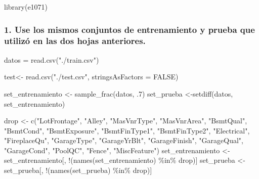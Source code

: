 \documentclass[
]{article}
\newenvironment{Shaded}{\begin{snugshade}}{\end{snugshade}}
\newcommand{\AttributeTok}[1]{\textcolor[rgb]{0.77,0.63,0.00}{#1}}
\newcommand{\ConstantTok}[1]{\textcolor[rgb]{0.00,0.00,0.00}{#1}}
\newcommand{\DecValTok}[1]{\textcolor[rgb]{0.00,0.00,0.81}{#1}}
\newcommand{\FunctionTok}[1]{\textcolor[rgb]{0.00,0.00,0.00}{#1}}
\newcommand{\NormalTok}[1]{#1}
\newcommand{\OtherTok}[1]{\textcolor[rgb]{0.56,0.35,0.01}{#1}}
\newcommand{\SpecialCharTok}[1]{\textcolor[rgb]{0.00,0.00,0.00}{#1}}
\newcommand{\StringTok}[1]{\textcolor[rgb]{0.31,0.60,0.02}{#1}}
\begin{document}
\begin{Shaded}
\begin{Highlighting}[]
\FunctionTok{library}\NormalTok{(e1071)}
\end{Highlighting}
\end{Shaded}

\hypertarget{use-los-mismos-conjuntos-de-entrenamiento-y-prueba-que-utilizuxf3-en-las-dos-hojas-anteriores.}{%
\subsubsection{1. Use los mismos conjuntos de entrenamiento y prueba que
utilizó en las dos hojas
anteriores.}\label{use-los-mismos-conjuntos-de-entrenamiento-y-prueba-que-utilizuxf3-en-las-dos-hojas-anteriores.}}

\begin{Shaded}
\begin{Highlighting}[]
\NormalTok{datos }\OtherTok{=} \FunctionTok{read.csv}\NormalTok{(}\StringTok{"./train.csv"}\NormalTok{)}

\NormalTok{test}\OtherTok{\textless{}{-}} \FunctionTok{read.csv}\NormalTok{(}\StringTok{"./test.csv"}\NormalTok{, }\AttributeTok{stringsAsFactors =} \ConstantTok{FALSE}\NormalTok{)}
\end{Highlighting}
\end{Shaded}

\begin{Shaded}
\begin{Highlighting}[]
\NormalTok{set\_entrenamiento }\OtherTok{\textless{}{-}} \FunctionTok{sample\_frac}\NormalTok{(datos, .}\DecValTok{7}\NormalTok{)}
\NormalTok{set\_prueba }\OtherTok{\textless{}{-}}\FunctionTok{setdiff}\NormalTok{(datos, set\_entrenamiento)}


\NormalTok{drop }\OtherTok{\textless{}{-}} \FunctionTok{c}\NormalTok{(}\StringTok{"LotFrontage"}\NormalTok{, }\StringTok{"Alley"}\NormalTok{, }\StringTok{"MasVnrType"}\NormalTok{, }\StringTok{"MasVnrArea"}\NormalTok{, }\StringTok{"BsmtQual"}\NormalTok{, }\StringTok{"BsmtCond"}\NormalTok{, }\StringTok{"BsmtExposure"}\NormalTok{, }\StringTok{"BsmtFinType1"}\NormalTok{, }\StringTok{"BsmtFinType2"}\NormalTok{, }\StringTok{"Electrical"}\NormalTok{, }\StringTok{"FireplaceQu"}\NormalTok{, }\StringTok{"GarageType"}\NormalTok{, }\StringTok{"GarageYrBlt"}\NormalTok{, }\StringTok{"GarageFinish"}\NormalTok{, }\StringTok{"GarageQual"}\NormalTok{, }\StringTok{"GarageCond"}\NormalTok{, }\StringTok{"PoolQC"}\NormalTok{, }\StringTok{"Fence"}\NormalTok{, }\StringTok{"MiscFeature"}\NormalTok{)}
\NormalTok{set\_entrenamiento }\OtherTok{\textless{}{-}}\NormalTok{ set\_entrenamiento[, }\SpecialCharTok{!}\NormalTok{(}\FunctionTok{names}\NormalTok{(set\_entrenamiento) }\SpecialCharTok{\%in\%}\NormalTok{ drop)]}
\NormalTok{set\_prueba }\OtherTok{\textless{}{-}}\NormalTok{ set\_prueba[, }\SpecialCharTok{!}\NormalTok{(}\FunctionTok{names}\NormalTok{(set\_prueba) }\SpecialCharTok{\%in\%}\NormalTok{ drop)]}
\end{Highlighting}
\end{Shaded}
\end{document}
